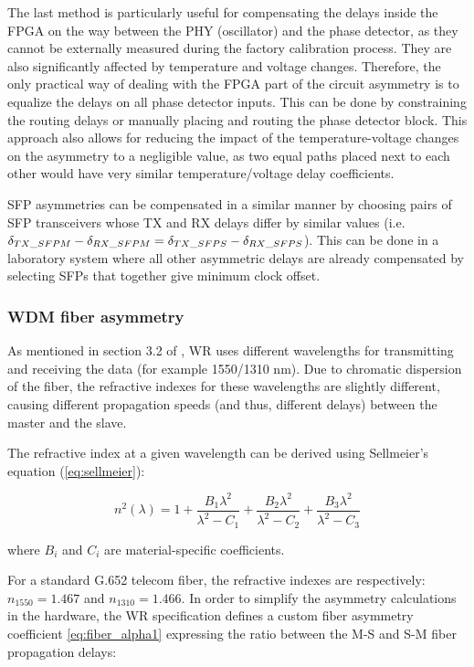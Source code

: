 The last method is particularly useful for compensating the delays inside
the FPGA on the way between the PHY (oscillator) and the phase detector,
as they cannot be externally measured during the factory calibration
process. They are also significantly affected by temperature and voltage
changes. Therefore, the only practical way of dealing with the FPGA part
of the circuit asymmetry is to equalize the delays on all phase detector
inputs. This can be done by constraining the routing delays or manually
placing and routing the phase detector block. This approach also allows for
reducing the impact of the temperature-voltage changes on the asymmetry to
a negligible value, as two equal paths placed next to each other would have
very similar temperature/voltage delay coefficients.

SFP asymmetries can be compensated in a similar manner by choosing pairs
of SFP transceivers whose TX and RX delays differ by similar values
(i.e. $\delta_{TX\us SFPM} - \delta_{RX\us SFPM} = \delta_{TX\us SFPS} -
\delta_{RX\us SFPS}$). This can be done in a laboratory system where all
other asymmetric delays are already compensated by selecting SFPs that
together give minimum clock offset.

\subsubsection{WDM fiber asymmetry}
\label{s:wdm_asymmetry}
As mentioned in section 3.2 of \cite{tomekMSC}, WR uses different wavelengths
for transmitting and receiving the data (for example 1550/1310 nm). Due
to chromatic dispersion of the fiber, the refractive indexes for these
wavelengths are slightly different, causing different propagation speeds
(and thus, different delays) between the master and the slave.

The refractive index at a given wavelength can be derived using Sellmeier's
equation  \cite{saleh07} (\ref{eq:sellmeier}):

\begin{equation}
\label{eq:sellmeier}
n^2(\lambda) = 1 + \frac{B_{1} \lambda^2}{\lambda^2 - C_{1}} + \frac{B_{2}
\lambda^2}{\lambda^2 - C_{2}} + \frac{B_{3} \lambda^2}{\lambda^2 - C_{3}}
\end{equation}

where $B_{i}$ and $C_{i}$ are material-specific coefficients.

For a standard G.652 telecom fiber, the refractive indexes are respectively:
$n_{1550} = 1.467$ and $n_{1310} = 1.466$. In order to simplify the asymmetry
calculations in the hardware, the WR specification defines
a custom fiber asymmetry coefficient \eqref{eq:fiber_alpha1} expressing the
ratio between the M-S and S-M fiber propagation delays:

